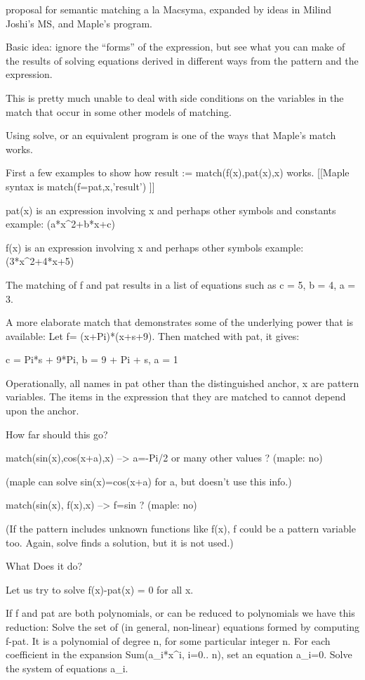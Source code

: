 
proposal for semantic matching a la Macsyma, expanded by
ideas in Milind Joshi's MS, and Maple's program.

Basic idea: ignore the ``forms'' of the expression,
but see what you can make of the results of solving equations 
derived in different ways from the pattern and the expression.

This is pretty much unable to deal with side conditions on the
variables in the match that occur in some other models of matching.

Using solve, or an equivalent program is one of the
ways that
 Maple's  match works.

First a few examples to show
how result := match(f(x),pat(x),x) works.
[[Maple syntax is match(f=pat,x,'result') ]]

pat(x) is an expression involving x and perhaps other symbols and constants
  example: (a*x^2+b*x+c) 

f(x) is an expression involving x and perhaps other symbols
  example: (3*x^2+4*x+5)

The matching of f and pat results in a list of equations such as
  {c = 5, b = 4, a = 3}.

A more elaborate match that demonstrates some of the
underlying power that is available: Let
 f= (x+Pi)*(x+s+9).  Then matched with pat, it gives:

  {c = Pi*s + 9*Pi, b = 9 + Pi + s, a = 1}


Operationally, all names in pat other than the distinguished anchor, x
are pattern variables. The items in the expression that they are
matched to cannot depend upon the anchor.


How far should this go?

match(sin(x),cos(x+a),x) --> {a=-Pi/2 or many other values}  ?  (maple: no)

(maple can solve sin(x)=cos(x+a) for a, but doesn't use this info.)

match(sin(x), f(x),x)  -->   {f=sin}    ?  (maple: no)

(If the pattern includes unknown functions like f(x), f could be
a pattern variable too. Again, solve finds a solution, but it is not used.)

What Does it do?

Let us try to solve f(x)-pat(x) = 0  for all x.

If f and pat are both polynomials, or can be reduced to
polynomials we have this reduction:
Solve the set of (in general, non-linear) equations formed by
computing f-pat.  It is a polynomial of degree n, for some
particular integer n.  For each coefficient in the expansion 
Sum(a_i*x^i, i=0.. n), set an equation a_i=0.  Solve the system
of equations {a_i}.

